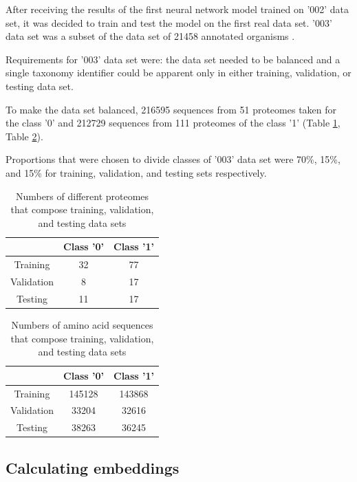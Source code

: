 \documentclass[12pt]{article}
\begin{document}
	After receiving the results of the first neural network model trained on 
	'002' data set, it was decided to train and test the model on the first 
	real data set. '003' data set was a subset of the data set of 21458 
	annotated organisms \cite{engqvist_martin_karl_magnus_2018_1175609}. 
	
	Requirements for '003' data set were: the data set needed to be balanced and a
	single taxonomy identifier could be apparent only in either training, validation,
	or testing data set. 
	
	To make the data set balanced, 216595 sequences from 51 proteomes taken 
	for the class '0' and 212729 sequences from 111 proteomes of the class '1' 
	(Table \ref{table:proteomes003}, Table \ref{table:sequences003}).

	Proportions that were chosen to divide classes of '003'
	data set were 70\%, 15\%, and 15\% for training, validation, and testing
	sets respectively.

	\begin{table}[h!]
		\caption{Numbers of different proteomes that compose training, 
		validation, and testing data sets}
		\vspace{0.2cm}
		\centering
		\begin{tabular}{ | c c c | }
			\hline
			& Class '0' & Class '1' \\
			\hline
			Training & 32 & 77 \\ 
			Validation & 8 & 17 \\
			Testing & 11 & 17 \\
			\hline   
		\end{tabular}
		\label{table:proteomes003}
	\end{table}

	\begin{table}[h!]
		\caption{Numbers of amino acid sequences that compose training, 
		validation, and testing data sets}
		\vspace{0.2cm}
		\centering
		\begin{tabular}{ | c c c | }
			\hline 
			& Class '0' & Class '1' \\
			\hline 
			Training & 145128 & 143868 \\
			Validation & 33204 & 32616 \\
			Testing & 38263 & 36245 \\
			\hline    
		\end{tabular}
		\label{table:sequences003}
	\end{table}

	\subsection{Calculating embeddings}
\end{document}
